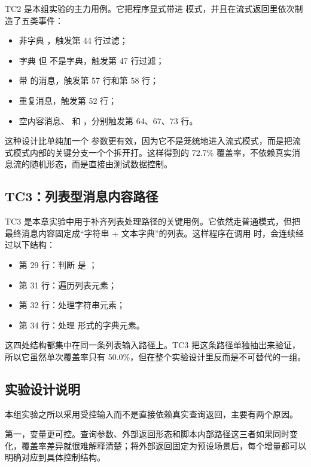TC2 是本组实验的主力用例。它把程序显式带进  模式，并且在流式返回里依次制造了五类事件：

\begin{itemize}
    \item 非字典 ，触发第 44 行过滤；
    \item 字典  但  不是字典，触发第 47 行过滤；
    \item 带  的消息，触发第 57 行和第 58 行；
    \item 重复消息，触发第 52 行；
    \item 空内容消息、 和 ，分别触发第 64、67、73 行。
\end{itemize}

这种设计比单纯加一个  参数更有效，因为它不是笼统地进入流式模式，而是把流式模式内部的关键分支一个个拆开打。这样得到的 72.7\% 覆盖率，不依赖真实消息流的随机形态，而是直接由测试数据控制。

\subsection{TC3：列表型消息内容路径}

TC3 是本章实验中用于补齐列表处理路径的关键用例。它依然走普通模式，但把最终消息内容固定成“字符串 + 文本字典”的列表。这样程序在调用  时，会连续经过以下结构：

\begin{itemize}
    \item 第 29 行：判断  是 ；
    \item 第 31 行：遍历列表元素；
    \item 第 32 行：处理字符串元素；
    \item 第 34 行：处理  形式的字典元素。
\end{itemize}

这四处结构都集中在同一条列表输入路径上。TC3 把这条路径单独抽出来验证，所以它虽然单次覆盖率只有 50.0\%，但在整个实验设计里反而是不可替代的一组。

\subsection{实验设计说明}

本组实验之所以采用受控输入而不是直接依赖真实查询返回，主要有两个原因。

第一，变量更可控。查询参数、外部返回形态和脚本内部路径这三者如果同时变化，覆盖率差异就很难解释清楚；将外部返回固定为预设场景后，每个增量都可以明确对应到具体控制结构。

